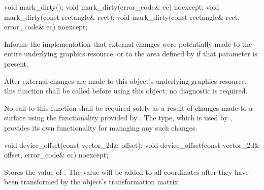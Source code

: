 \begin{itemdecl}
void mark_dirty();
void mark_dirty(error_code& ec) noexcept;
void mark_dirty(const rectangle& rect);
void mark_dirty(const rectangle& rect, error_code& ec) noexcept;
\end{itemdecl}
\begin{itemdescr}
\pnum
\effects
Informs the implementation that external changes were potentially made to the entire underlying graphics resource, or to the area defined by  if that parameter is present.

\pnum
\remarks
After external changes are made to this  object's underlying graphics resource, this function shall be called before using this  object; no diagnostic is required.

\pnum
No call to this function shall be required solely as a result of changes made to a surface using the functionality provided by .
\enternote
The  type, which is used by , provides its own functionality for managing any such changes.
\exitnote
\end{itemdescr}

\begin{itemdecl}
void device_offset(const vector_2d& offset);
void device_offset(const vector_2d& offset, error_code& ec) noexcept;
\end{itemdecl}
\begin{itemdescr}
\pnum
\effects
Stores the value of . The value will be added to all coordinates after they have been transformed by the  object's transformation matrix.
\end{itemdescr}

